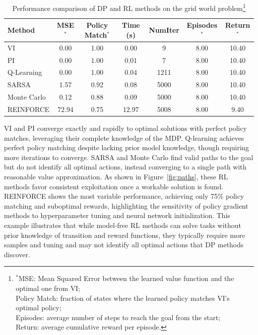 \begin{table}[h]
\centering
\caption{Performance comparison of DP and RL methods on the grid world problem\footnote{
$^*$MSE: Mean Squared Error between the learned value function and the optimal one from VI; \\
Policy Match: fraction of states where the learned policy matches VI’s optimal policy; \\
Episodes: average number of steps to reach the goal from the start; \\
Return: average cumulative reward per episode.}}
\label{tab:results}
\begin{tabular}{lcccccc}
\hline
\textbf{Method} & \textbf{MSE}$^*$ & \textbf{Policy Match}$^*$ & \textbf{Time (s)} & \textbf{NumIter} & \textbf{Episodes}$^*$ & \textbf{Return}$^*$ \\
\hline
VI & 0.00 & 1.00 & 0.00 & 9 & 8.00 & 10.40 \\
PI & 0.00 & 1.00 & 0.01 & 7 & 8.00 & 10.40 \\
Q-Learning & 0.00 & 1.00 & 0.04 & 1211 & 8.00 & 10.40 \\
SARSA & 1.57 & 0.92 & 0.08 & 5000 & 8.00 & 10.40 \\
Monte Carlo & 0.12 & 0.88 & 0.09 & 5000 & 8.00 & 10.40 \\
REINFORCE & 72.94 & 0.75 & 12.97 & 5008 & 8.00 & 9.40 \\
\hline
\end{tabular}

\end{table}

VI and PI converge exactly and rapidly to optimal solutions with perfect policy matches, leveraging their complete knowledge of the MDP. Q-learning achieves perfect policy matching despite lacking prior model knowledge, though requiring more iterations to converge. SARSA and Monte Carlo find valid paths to the goal but do not identify all optimal actions, instead converging to a single path with reasonable value approximation. As shown in Figure~\ref{fig:paths}, these RL methods favor consistent exploitation once a workable solution is found. REINFORCE shows the most variable performance, achieving only 75\% policy matching and suboptimal rewards, highlighting the sensitivity of policy gradient methods to hyperparameter tuning and neural network initialization. This example illustrates that while model-free RL methods can solve tasks without prior knowledge of transition and reward functions, they typically require more samples and tuning and may not identify all optimal actions that DP methods discover. 

